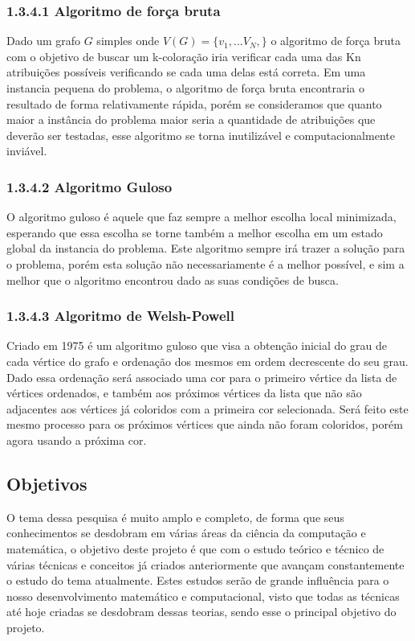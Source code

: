 \documentclass[12pt]{article}
\begin{document}
	\subsubsection*{1.3.4.1 Algoritmo de força bruta}
	Dado um grafo $G$ simples onde $V(G) = \{v_{1}, ... V_{N},\}$ o algoritmo de força bruta com o objetivo de buscar um k-coloração iria verificar cada uma das Kn atribuições possíveis verificando se cada uma delas está correta. Em uma instancia pequena do problema, o algoritmo de força bruta encontraria o resultado de forma relativamente rápida, porém se consideramos que quanto maior a instância do problema maior seria a quantidade de atribuições que deverão ser testadas, esse algoritmo se torna inutilizável e computacionalmente inviável.
	
	\subsubsection*{1.3.4.2 Algoritmo Guloso}
	
	O algoritmo guloso é aquele que faz sempre a melhor escolha local minimizada, esperando que essa escolha se torne também a melhor escolha em um estado global da instancia do problema.
	Este algoritmo sempre irá trazer a solução para o problema, porém esta solução não necessariamente é a melhor possível, e sim a melhor que o algoritmo encontrou dado as suas condições de busca.
	
	
	\subsubsection*{1.3.4.3 Algoritmo de Welsh-Powell}
	
	Criado em 1975 é um algoritmo guloso que visa a obtenção inicial do grau de cada vértice do grafo e ordenação dos mesmos em ordem decrescente do seu grau. Dado essa ordenação será associado uma cor para o primeiro vértice da lista de vértices ordenados, e também aos próximos vértices da lista que não são adjacentes aos vértices já coloridos com a primeira cor selecionada. Será feito este mesmo processo para os próximos vértices que ainda não foram coloridos, porém agora usando a próxima cor.
	
	\subsection{Objetivos}
	
	O tema dessa pesquisa é muito amplo e completo, de forma que seus conhecimentos se desdobram em várias áreas da ciência da computação e matemática, o objetivo deste projeto é que com o estudo teórico e técnico de várias técnicas e conceitos já criados anteriormente que avançam constantemente o estudo do tema atualmente.
	Estes estudos serão de grande influência para o nosso desenvolvimento matemático e computacional, visto que todas as técnicas até hoje criadas se desdobram dessas teorias, sendo esse o principal objetivo do projeto.
	
\end{document}
